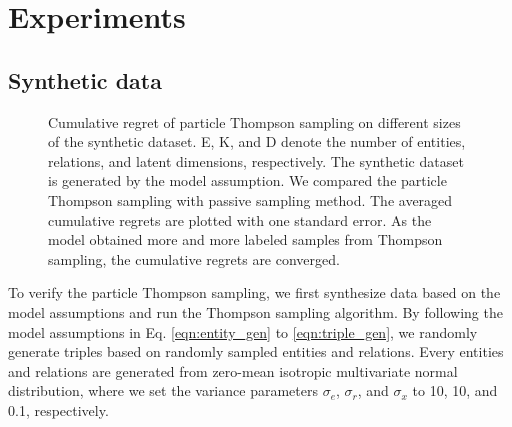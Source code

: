 \section{Experiments}

\subsection{Synthetic data}
\begin{figure}[t]
	\centering
	
	\caption{\label{fig:synthetic} Cumulative regret of particle Thompson sampling on different sizes of the synthetic dataset. E, K, and D denote the number of entities, relations, and latent dimensions, respectively. The synthetic dataset is generated by the model assumption. We compared the particle Thompson sampling with passive sampling method. The averaged cumulative regrets are plotted with one standard error. As the model obtained more and more labeled samples from Thompson sampling, the cumulative regrets are converged. }
\end{figure}

To verify the particle Thompson sampling, we first synthesize data based on the model assumptions and run the Thompson sampling algorithm. By following the model assumptions in Eq. \ref{eqn:entity_gen} to \ref{eqn:triple_gen}, we randomly generate triples based on randomly sampled entities and relations. Every entities and relations are generated from zero-mean isotropic multivariate normal distribution, where we set the variance parameters $\sigma_e$, $\sigma_r$, and $\sigma_x$ to 10, 10, and 0.1, respectively.

